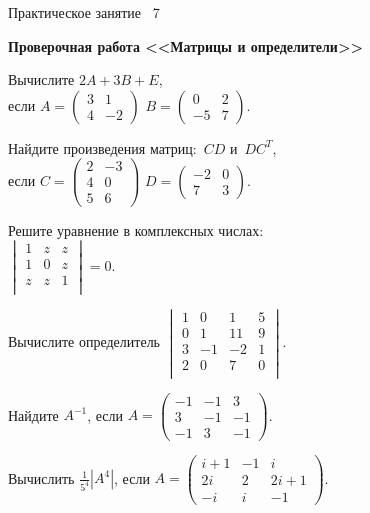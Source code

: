 \documentclass[a5paper,17pt]{extarticle}
\begin{document}
\begin{enumerate}
{\item[]\centering \small Практическое занятие \textnumero~7 
\par\bfseries Проверочная работа <<Матрицы и определители>>\par}

\item Вычислите $2A+3B+E$,\\ если
$A=\begin{pmatrix}3&1\\4&-2\end{pmatrix}$ 
$B=\begin{pmatrix}0&2\\-5&7\end{pmatrix}$.
\item Найдите произведения матриц:~$CD$ и~$DC^T$,\\ если
$C=\begin{pmatrix}2&-3\\4 & 0 \\ 5&6 \end{pmatrix} $
$D=\begin{pmatrix}-2&0\\7&3\end{pmatrix}$.

\item Решите уравнение в комплексных числах: \\
$\begin{vmatrix}
1 & z & z \\
1 & 0 & z \\
z & z & 1 \\
\end{vmatrix}=0$.

\item Вычислите определитель $
\begin{vmatrix}
1 & 0 & 1 & 5\\
0 & 1 & 11 & 9\\
3 & -1 & -2 & 1\\
2 & 0 & 7 & 0\\
\end{vmatrix}.
$
\item Найдите $A^{-1}$, если
$A=\begin{pmatrix}-1 & -1 & 3\\ 3 & -1 & -1\\ -1 & 3 & -1\end{pmatrix}$.
\item Вычислить $\frac{1}{5^4}\left|A^{4}\right|$, если $A=\begin{pmatrix}i+1 & -1 & i\\ 2i & 2 & 2i+1\\ -i & i & -1\end{pmatrix}$.
\end{enumerate}
\newpage
\end{document}
